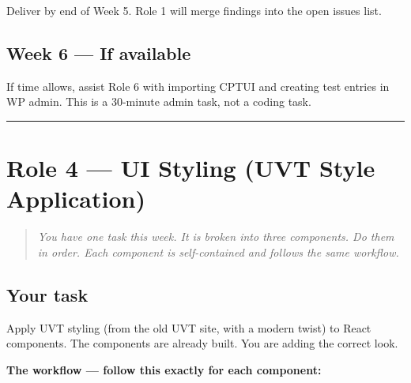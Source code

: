 \documentclass[11pt,a4paper]{article}
\newcommand{\grouprule}{\vspace{0.3em}\textcolor{ruleLine}{\rule{\linewidth}{0.4pt}}\vspace{0.3em}}
\begin{document}
Deliver by end of Week 5. Role 1 will merge findings into the open issues list.

\subsection{Week 6 — If available}

If time allows, assist Role 6 with importing CPTUI and creating test entries in WP admin. This is a 30-minute admin task, not a coding task.

\grouprule

\section{Role 4 — UI Styling (UVT Style Application)}

\begin{quote}\itshape
You have one task this week. It is broken into three components. Do them in order. Each component is self-contained and follows the same workflow.
\end{quote}

\subsection{Your task}

Apply UVT styling (from the old UVT site, with a modern twist) to React components. The components are already built. You are adding the correct look.

\textbf{The workflow — follow this exactly for each component:}
\end{document}
